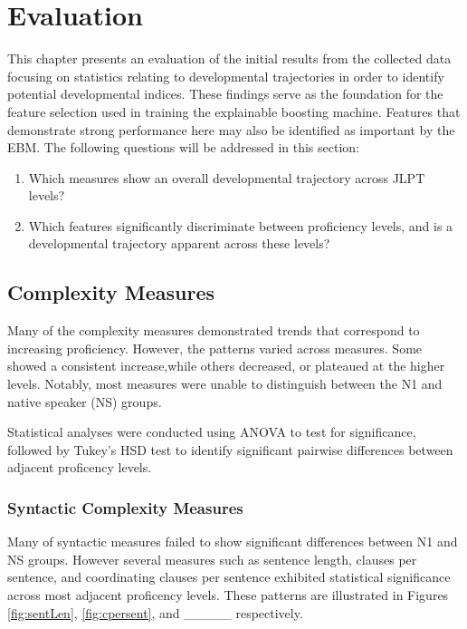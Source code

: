 \chapter{Evaluation} 
This chapter presents an evaluation of the initial results from the collected data focusing on statistics relating to
developmental trajectories in order to identify potential developmental indices. These findings serve as the
foundation
for the feature selection used in training the explainable boosting machine. Features that demonstrate strong
performance here may also be identified as important by the EBM. The following questions will be addressed in this
section:

\begin{enumerate}
    \item Which measures show an overall developmental trajectory across JLPT levels?
    \item Which features significantly discriminate between proficiency levels, and is a developmental trajectory
    apparent across these levels?
\end{enumerate}

\section{Complexity Measures}

Many of the complexity measures demonstrated trends that correspond to increasing proficiency. However, the patterns
varied across measures. Some showed a consistent increase,while others
decreased, or plateaued at the
higher levels. Notably, most measures were unable to distinguish between the N1 and native speaker (NS) groups.

Statistical analyses were conducted using ANOVA to test for significance, followed by Tukey's HSD test to identify
significant pairwise differences between adjacent proficency levels.

\subsection{Syntactic Complexity Measures}


Many of syntactic measures failed to show significant differences between N1 and NS groups. However several measures
such as sentence length, clauses per sentence, and coordinating clauses per sentence exhibited statistical significance
across most
adjacent proficency levels. These patterns are illustrated in Figures \ref{fig:sentLen}, \ref{fig:cpersent}, and
_____ respectively.

